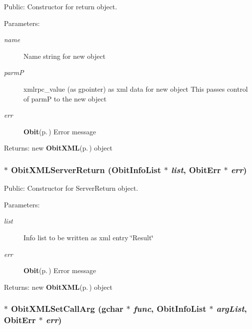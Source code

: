 Public: Constructor for return object. 

\begin{Desc}
\item[Parameters:]
\begin{description}
\item[{\em name}]Name string for new object \item[{\em parm\-P}]xmlrpc\_\-value (as gpointer) as xml data for new object This passes control of parm\-P to the new object \item[{\em err}]{\bf Obit}{\rm (p.\,\pageref{structObit})} Error message \end{description}
\end{Desc}
\begin{Desc}
\item[Returns:]new {\bf Obit\-XML}{\rm (p.\,\pageref{structObitXML})} object \end{Desc}
\subsubsection{$\ast$ Obit\-XMLServer\-Return ({\bf Obit\-Info\-List} $\ast$ {\em list}, {\bf Obit\-Err} $\ast$ {\em err})}\label{ObitXML_8h_a33}


Public: Constructor for Server\-Return object. 

\begin{Desc}
\item[Parameters:]
\begin{description}
\item[{\em list}]Info list to be written as xml entry \char`\"{}Result\char`\"{} \item[{\em err}]{\bf Obit}{\rm (p.\,\pageref{structObit})} Error message \end{description}
\end{Desc}
\begin{Desc}
\item[Returns:]new {\bf Obit\-XML}{\rm (p.\,\pageref{structObitXML})} object \end{Desc}
\subsubsection{$\ast$ Obit\-XMLSet\-Call\-Arg (gchar $\ast$ {\em func}, {\bf Obit\-Info\-List} $\ast$ {\em arg\-List}, {\bf Obit\-Err} $\ast$ {\em err})}\label{ObitXML_8h_a17}


